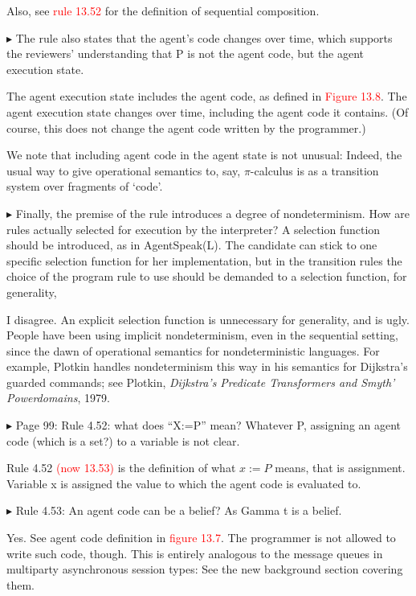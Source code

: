 \documentclass{article}
\newcommand*\R[1]{\textcolor{red}{#1}} %
\newenvironment{them}%
  {\bigskip\noindent\begingroup\color{blue}$\blacktriangleright$\enspace}%
  {\endgroup\par}
\begin{document}
Also, see \R{rule 13.52} for the definition of sequential composition.


\begin{them}
The rule also states that the agent's code changes over time, which supports
the reviewers' understanding that P is not the agent code, but the agent
execution state.
\end{them}
The agent execution state includes the agent code, as defined in \R{Figure 13.8}. The agent execution state changes over time,
  including the agent code it contains.
(Of course, this does not change the agent code written by the programmer.)

We note that including agent code in the agent state is not unusual:
  Indeed, the usual way to give operational semantics to, say,
    $\pi$-calculus is as a transition system over fragments of `code'.

\begin{them}
Finally, the premise of the rule introduces a degree of nondeterminism. How are
rules actually selected for execution by the interpreter? A selection function
should be introduced, as in AgentSpeak(L). The candidate can stick to one
specific selection function for her implementation, but in the transition rules
the choice of the program rule to use should be demanded to a selection
function, for generality,
\end{them}
I disagree.
An explicit selection function is unnecessary for generality, and is ugly.
People have been using implicit nondeterminism,
  even in the sequential setting,
  since the dawn of operational semantics for nondeterministic languages.
For example,
  Plotkin handles nondeterminism this way in his semantics for
  Dijkstra's guarded commands;
see Plotkin, {\it Dijkstra's Predicate Transformers and Smyth' Powerdomains},
  1979.


\begin{them}
Page 99:
Rule 4.52: what does ``X:=P'' mean? Whatever P, assigning an agent code (which is
a set?) to a variable is not clear.
\end{them}
Rule 4.52 \R{(now 13.53)} is the definition of what $x:=P$ means, that is
assignment. Variable x is assigned the value to which the agent code is
evaluated to.

\begin{them}
Rule 4.53:
An agent code can be a belief? As Gamma t is a belief.
\end{them}
Yes. See agent code definition in \R{figure 13.7}.
The programmer is not allowed to write such code, though.
This is entirely analogous to the message queues in
  multiparty asynchronous session types:
  See the new background section covering them.
\end{document}
